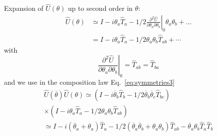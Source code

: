 \documentclass[12pt]{article}
\newcommand{\be}{\begin{equation}}
\newcommand{\ee}{\end{equation}}
\begin{document}
Expansion of $\hat{U}(\theta)$ up to second order in $\theta$:
\begin{align}
\hat{U}(\theta) 
&\simeq I- i \theta_{a} \hat{T}_a-1 /2 \left.\frac{\partial^{2} \hat{U}}{\partial \theta_{a} \partial \theta_{b}}\right|_{0} \theta_{a} \theta_{b}+\ldots\\
&=I-i \theta_{a} \hat{T}_{a}-1 / 2 \theta_{a} \theta_{b} \hat{T}_{a b}+\cdots
\end{align}
with
\[
\left.\frac{\partial^{2} \hat{U}}{\partial \theta_{a} \partial \theta_{b}}\right|_{0} = \hat{T}_{ab} = \hat{T}_{ba}
\]
and we use in the composition law Eq.~\eqref{eq:symmetries3}
\be
\begin{gathered}
\hat{U}(\overline{\theta}) \hat{U}(\theta) \simeq\left(I-i \overline{\theta}_{b} \hat{T}_{b}-1 / 2 \overline{\theta}_{b} \overline{\theta}_{c} \hat{T}_{b c}\right) \\ 
\times\left(I-i \theta_{a} \hat{T}_{a}-1 / 2 \theta_{a} \theta_{b} \hat{T}_{a b}\right) \\ 
\simeq I-i\left(\overline{\theta}_{a}+\theta_{a}\right) \hat{T}_{a}-1 / 2\left(\overline{\theta}_{a} \overline{\theta}_{b}+\theta_{a} \theta_{b}\right) \hat{T}_{a b}-\overline{\theta}_{a} \theta_{b} \hat{T}_{a} \hat{T}_{b}
\end{gathered}
\label{eq:symmetries4}
\ee

\end{document}
